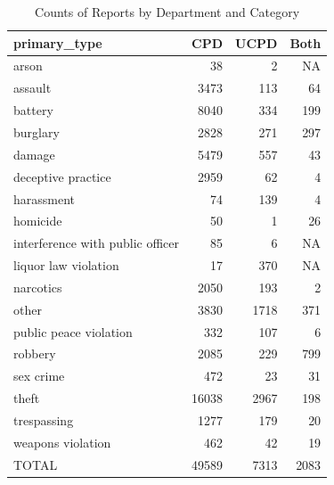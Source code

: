 \documentclass{ucetd}
\begin{document}
\begin{table}

\caption{\label{tab:cat-counts}Counts of Reports by Department and Category}
\centering
\begin{tabular}[t]{l|r|r|r}
\hline
primary\_type & CPD & UCPD & Both\\
\hline
arson & 38 & 2 & NA\\
\hline
assault & 3473 & 113 & 64\\
\hline
battery & 8040 & 334 & 199\\
\hline
burglary & 2828 & 271 & 297\\
\hline
damage & 5479 & 557 & 43\\
\hline
deceptive practice & 2959 & 62 & 4\\
\hline
harassment & 74 & 139 & 4\\
\hline
homicide & 50 & 1 & 26\\
\hline
interference with public officer & 85 & 6 & NA\\
\hline
liquor law violation & 17 & 370 & NA\\
\hline
narcotics & 2050 & 193 & 2\\
\hline
other & 3830 & 1718 & 371\\
\hline
public peace violation & 332 & 107 & 6\\
\hline
robbery & 2085 & 229 & 799\\
\hline
sex crime & 472 & 23 & 31\\
\hline
theft & 16038 & 2967 & 198\\
\hline
trespassing & 1277 & 179 & 20\\
\hline
weapons violation & 462 & 42 & 19\\
\hline
TOTAL & 49589 & 7313 & 2083\\
\hline
\end{tabular}
\end{table}
\end{document}
